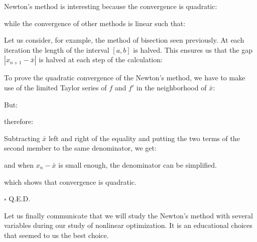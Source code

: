 	\begin{theorem}
	Newton's method is interesting because the convergence is quadratic:
	
	while the convergence of other methods is linear such that:
	
	Let us consider, for example, the method of bisection seen previously. At each iteration the length of the interval $[a, b]$ is halved. This ensures us that the gap $|x_{n+1}-\bar{x}|$ is halved at each step of the calculation:
	
	\end{theorem}
	\begin{dem}
	To prove the quadratic convergence of the Newton's method, we have to make use of the limited Taylor series of $f$ and $f'$ in the neighborhood of $\bar{x}$:
	
	But:
	
	therefore:
	
	Subtracting $\bar{x}$ left and right of the equality and putting the two terms of the second member to the same denominator, we get:
	
	and when $x_n-\bar{x}$ is small enough, the denominator can be simplified.
	
	which shows that convergence is quadratic.
	\begin{flushright}
		$\square$  Q.E.D.
	\end{flushright}
	\end{dem}
	\begin{tcolorbox}[title=Remark,colframe=black,arc=10pt]
	Let us finally communicate that we will study the Newton's method with several variables during our study of nonlinear optimization. It is an educational choices that seemed to us the best choice.
	\end{tcolorbox}	
